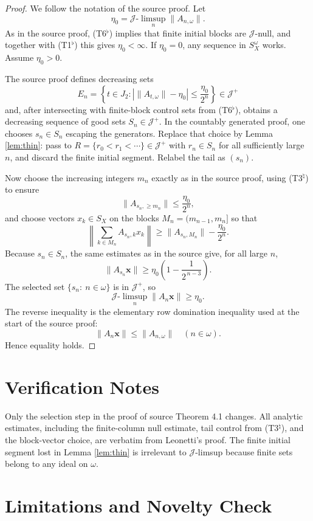 \documentclass[11pt]{article}
\newcommand{\J}{\mathcal J}
\newcommand{\limsupJ}{\J\text{-}\limsup}
\begin{document}
\begin{proof}
We follow the notation of the source proof. Let
\[
  \eta_0=\limsupJ_n\|A_{n,\omega}\|.
\]
As in the source proof, (T6$^\flat$) implies that finite initial blocks are
$\J$-null, and together with (T1$^\flat$) this gives $\eta_0<\infty$. If
$\eta_0=0$, any sequence in $S_X^\omega$ works. Assume $\eta_0>0$.

The source proof defines decreasing sets
\[
 E_n=\left\{t\in J_2:\left|\|A_{t,\omega}\|-\eta_0\right|
          \le \frac{\eta_0}{2^n}\right\}\in\J^+
\]
and, after intersecting with finite-block control sets from (T6$^\flat$),
obtains a decreasing sequence of good sets $S_n\in\J^+$. In the countably
generated proof, one chooses $s_n\in S_n$ escaping the generators. Replace that
choice by Lemma \ref{lem:thin}: pass to $R=\{r_0<r_1<\cdots\}\in\J^+$ with
$r_n\in S_n$ for all sufficiently large $n$, and discard the finite initial
segment. Relabel the tail as $(s_n)$.

Now choose the increasing integers $m_n$ exactly as in the source proof, using
(T3$^\natural$) to ensure
\[
  \|A_{s_n,\ge m_n}\|\le \frac{\eta_0}{2^n},
\]
and choose vectors $x_k\in S_X$ on the blocks
$M_n=(m_{n-1},m_n]$ so that
\[
  \left\|\sum_{k\in M_n}A_{s_n,k}x_k\right\|
  \ge \|A_{s_n,M_n}\|-\frac{\eta_0}{2^n}.
\]
Because $s_n\in S_n$, the same estimates as in the source give, for all large
$n$,
\[
  \|A_{s_n}\mathbf x\|
  \ge
  \eta_0\left(1-\frac1{2^{\,n-3}}\right).
\]
The selected set $\{s_n:\ n\in\omega\}$ is in $\J^+$, so
\[
  \limsupJ_n\|A_n\mathbf x\|\ge \eta_0.
\]
The reverse inequality is the elementary row domination inequality used at the
start of the source proof:
\[
  \|A_n\mathbf x\|\le \|A_{n,\omega}\| \quad (n\in\omega).
\]
Hence equality holds.
\end{proof}

\section*{Verification Notes}

Only the selection step in the proof of source Theorem 4.1 changes. All analytic
estimates, including the finite-column null estimate, tail control from
(T3$^\natural$), and the block-vector choice, are verbatim from Leonetti's
proof. The finite initial segment lost in Lemma \ref{lem:thin} is irrelevant to
$\J$-limsup because finite sets belong to any ideal on $\omega$.

\section*{Limitations and Novelty Check}
\end{document}
